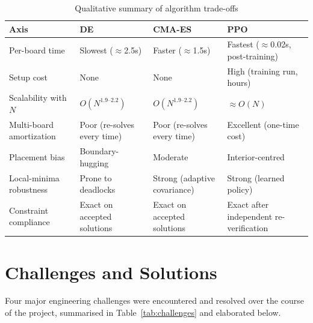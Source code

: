\documentclass[11pt,a4paper,oneside]{report}
\begin{document}
\begin{table}[H]
\centering
\caption{Qualitative summary of algorithm trade-offs}
\label{tab:algo_summary}
\begin{tabular}{|p{2.6cm}|p{3.3cm}|p{3.3cm}|p{3.4cm}|}
\hline
\textbf{Axis} & \textbf{DE} & \textbf{CMA-ES} & \textbf{PPO} \\
\hline
Per-board time & Slowest ($\approx$2.5s) & Faster ($\approx$1.5s) & Fastest ($\approx$0.02s, post-training) \\ \hline
Setup cost & None & None & High (training run, hours) \\ \hline
Scalability with $N$ & $O(N^{1.9\text{--}2.2})$ & $O(N^{1.9\text{--}2.2})$ & $\approx O(N)$ \\ \hline
Multi-board amortization & Poor (re-solves every time) & Poor (re-solves every time) & Excellent (one-time cost) \\ \hline
Placement bias & Boundary-hugging & Moderate & Interior-centred \\ \hline
Local-minima robustness & Prone to deadlocks & Strong (adaptive covariance) & Strong (learned policy) \\ \hline
Constraint compliance & Exact on accepted solutions & Exact on accepted solutions & Exact after independent re-verification \\
\hline
\end{tabular}
\end{table}

\chapter{Challenges and Solutions}
\label{chap:challenges}
Four major engineering challenges were encountered and resolved over the course of the project, summarised in Table~\ref{tab:challenges} and elaborated below.
\end{document}
